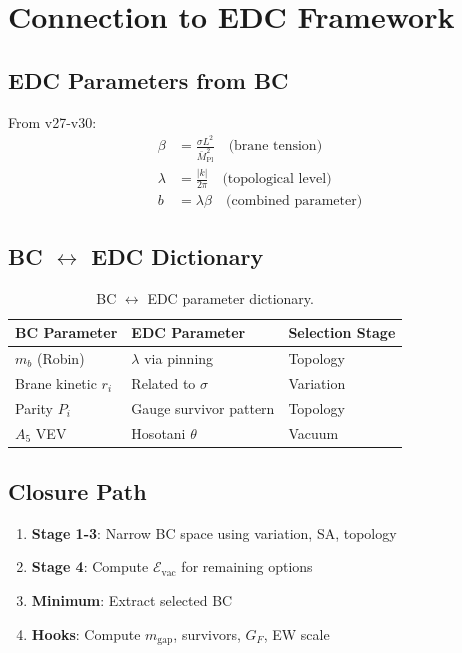 \documentclass[11pt,a4paper]{article}
\begin{document}
\section{Connection to EDC Framework}

\subsection{EDC Parameters from BC}

From v27-v30:
\begin{align}
\label{eq:edc-from-bc-1}
\beta &= \frac{\sigma L^2}{\bar{M}_{\text{Pl}}^2} \quad \text{(brane tension)} \\
\label{eq:edc-from-bc-2}
\lambda &= \frac{|k|}{2\pi} \quad \text{(topological level)} \\
\label{eq:edc-from-bc-3}
b &= \lambda \beta \quad \text{(combined parameter)}
\end{align}

\subsection{BC $\leftrightarrow$ EDC Dictionary}

\begin{table}[h]
\centering
\begin{tabular}{lll}
\toprule
BC Parameter & EDC Parameter & Selection Stage \\
\midrule
$m_b$ (Robin) & $\lambda$ via pinning & Topology \\
Brane kinetic $r_i$ & Related to $\sigma$ & Variation \\
Parity $P_i$ & Gauge survivor pattern & Topology \\
$A_5$ VEV & Hosotani $\theta$ & Vacuum \\
\bottomrule
\end{tabular}
\caption{BC $\leftrightarrow$ EDC parameter dictionary.}
\label{tab:bc-edc}
\end{table}

\subsection{Closure Path}

\begin{enumerate}
    \item \textbf{Stage 1-3}: Narrow BC space using variation, SA, topology
    \item \textbf{Stage 4}: Compute $\mathcal{E}_{\text{vac}}$ for remaining options
    \item \textbf{Minimum}: Extract selected BC
    \item \textbf{Hooks}: Compute $m_{\text{gap}}$, survivors, $G_F$, EW scale
\end{enumerate}
\end{document}
